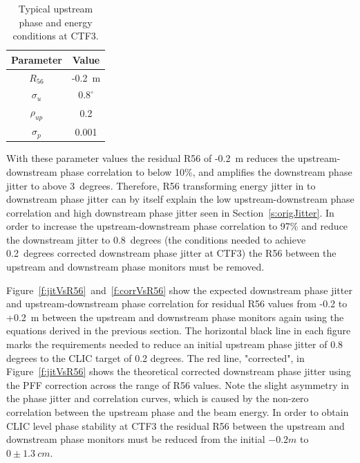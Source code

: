 \begin{table}
  \begin{center}
    \begin{tabular}{| c c |}
	   \hline
       Parameter & Value \\ \hline
       \(R_{56}\) & -0.2~m \\
       \(\sigma_u\) & \(0.8^\circ\) \\
       \(\rho_{up}\) & 0.2 \\
       \(\sigma_{p}\) & 0.001 \\ \hline
    \end{tabular}
    \caption{Typical upstream phase and energy conditions at CTF3.}
  	\label{t:r56Params}
  \end{center}
\end{table}

With these parameter values the residual R56 of -0.2~m reduces the upstream-downstream phase correlation to below 10\%, and amplifies the downstream phase jitter to above 3~degrees. Therefore, R56 transforming energy jitter in to downstream phase jitter can by itself explain the low upstream-downstream phase correlation and high downstream phase jitter seen in Section~\ref{s:origJitter}. In order to increase the upstream-downstream phase correlation to 97\% and reduce the downstream jitter to 0.8~degrees (the conditions needed to achieve 0.2~degrees corrected downstream phase jitter at CTF3) the R56 between the upstream and downstream phase monitors must be removed.

Figure~\ref{f:jitVsR56}~and~\ref{f:corrVsR56} show the expected downstream phase jitter and upstream-downstream phase correlation for residual R56 values from -0.2 to +0.2~m between the upstream and downstream phase monitors again using the equations derived in the previous section. The horizontal black line in each figure marks the requirements needed to reduce an initial upstream phase jitter of 0.8 degrees to the CLIC target of 0.2 degrees. The red line, "corrected", in Figure~\ref{f:jitVsR56} shows the theoretical corrected downstream phase jitter using the PFF correction across the range of R56 values. Note the slight asymmetry in the phase jitter and correlation curves, which is caused by the non-zero correlation between the upstream phase and the beam energy. In order to obtain CLIC level phase stability at CTF3 the residual R56 between the upstream and downstream phase monitors must be reduced from the initial \(-0.2m\) to \(0\pm1.3~cm\).

